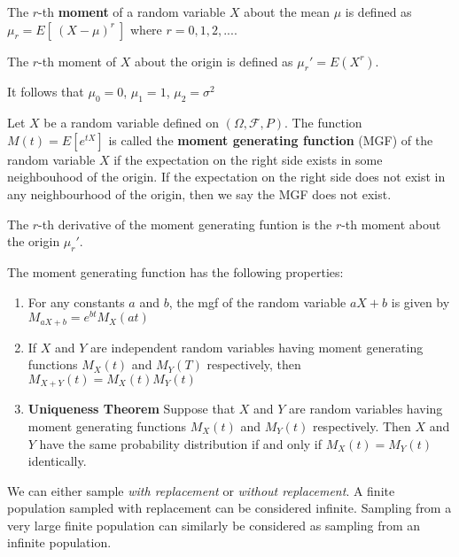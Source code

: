 \begin{defn}[Moments]
    The $r$-th \textbf{moment} of a random variable $X$ about the mean $\mu$ is defined as $\mu_r = E[\  (X - \mu)^r \ ]$ where $r=0, 1, 2, ...$. 

    The $r$-th moment of $X$ about the origin is defined as $\mu_r ' = E(X^r)$.
\end{defn}

It follows that $\mu_0 = 0$, $\mu_1 = 1$, $\mu_2 = \sigma ^2$

\begin{samepage}
\begin{defn}
    Let $X$ be a random variable defined on $\left (\Omega,  \mathcal{F}, P\right )$. The function $M\left (t\right ) = E\left [e ^{t X}\right ]$ is called the \textbf{moment generating function} (MGF) of the random variable $X$ if the expectation on the right side exists in some neighbouhood of the origin. If the expectation on the right side does not exist in any neighbourhood of the origin, then we say the MGF does not exist.
\end{defn}

The $r$-th derivative of the moment generating funtion is the $r$-th moment about the origin $\mu_r '$.
\end{samepage}

\begin{thm}
    The moment generating function has the following properties:
    \begin{enumerate}
        \item For any constants $a$ and $b$, the mgf of the random variable $a X + b$ is given by $M_{aX+b} = e^{bt} M_X(at)$
        \item If $X$ and $Y$ are independent random variables having moment generating functions $M_X(t)$ and $M_Y(T)$ respectively, then $M_{X+Y}(t) = M_X(t) M_Y(t)$
        \item \textbf{Uniqueness Theorem} Suppose that $X$ and $Y$ are random variables having moment generating functions $M_X(t)$ and $M_Y(t)$ respectively. Then $X$ and $Y$ have the same probability distribution if and only if $M_X(t) = M_Y(t)$ identically.
    \end{enumerate}
\end{thm}

We can either sample \textit{with replacement} or \textit{without replacement}. A finite population sampled with replacement can be considered infinite. Sampling from a very large finite population can similarly be considered as sampling from an infinite population. 

